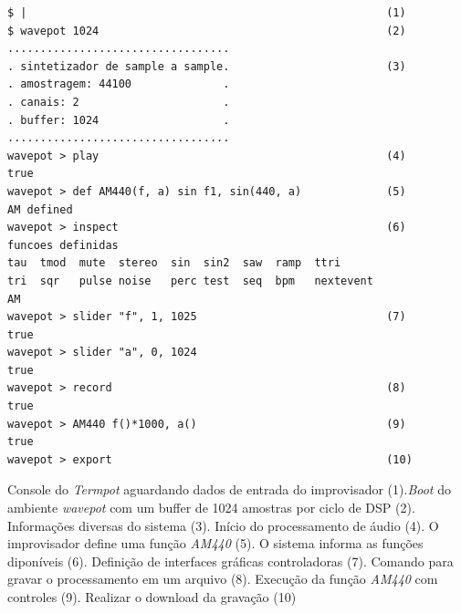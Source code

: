 \begin{listing}
\begin{verbatim}
$ |                                                       (1)
$ wavepot 1024                                            (2)
..................................
. sintetizador de sample a sample.                        (3) 
. amostragem: 44100              .
. canais: 2                      .
. buffer: 1024                   .
..................................
wavepot > play                                            (4)                                                      
true
wavepot > def AM440(f, a) sin f1, sin(440, a)             (5)
AM defined
wavepot > inspect                                         (6)
funcoes definidas 
tau  tmod  mute  stereo  sin  sin2  saw  ramp  ttri
tri  sqr   pulse noise	 perc test  seq  bpm   nextevent
AM
wavepot > slider "f", 1, 1025                             (7)
true
wavepot > slider "a", 0, 1024            
true
wavepot > record                                          (8)
true
wavepot > AM440 f()*1000, a()                             (9)
true
wavepot > export                                          (10)
\end{verbatim}
\tiny{\caption{Console do \emph{Termpot} aguardando dados de entrada do improvisador (1).\emph{Boot} do ambiente \emph{wavepot} com um buffer de 1024 amostras por ciclo de DSP (2). Informações diversas do sistema (3). Início do processamento de áudio (4). O improvisador define uma função \emph{AM440} (5). O sistema informa as funções diponíveis (6). Definição de interfaces gráficas controladoras (7). Comando para gravar o processamento em um arquivo (8). Execução da função \emph{AM440} com controles (9). Realizar o download da gravação (10)}}
\label{code:resultado1}
\end{listing}